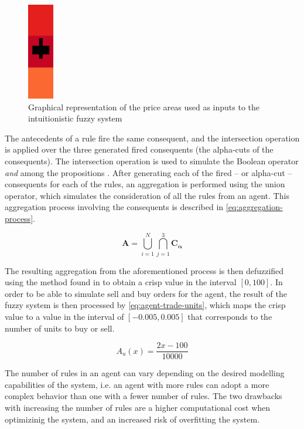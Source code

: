 \begin{figure}
\centering
\includegraphics[height=0.15\textwidth]{img/areas-for-ifis.png}
\caption{Graphical representation of the price areas used as inputs to the
  intuitionistic fuzzy system}
\label{figure:areas-for-ifis}
\end{figure}

The antecedents of a rule fire the same consequent, and the intersection
operation is applied over the three generated fired consequents (the alpha-cuts
of the consequents). The intersection operation is used to simulate the Boolean
operator \textit{and} among the propositions \cite{Atanassov1986}. After
generating each of the fired -- or alpha-cut -- consequents for each of the rules,
an aggregation is performed using the union operator, which simulates the
consideration of all the rules from an agent. This aggregation process involving
the consequents is described in \ref{eq:aggregation-process}.

\begin{equation}
  \label{eq:aggregation-process}
  \bm{A} = \bigcup\limits_{i=1}^{N} \bigcap\limits_{j=1}^{3} \bm{C_{\alpha}}
\end{equation}

The resulting aggregation from the aforementioned process is then
defuzzified using the method found in \cite{Hernandez-Aguila2017} to obtain a
crisp value in the interval $[0, 100]$. In order to be able to simulate sell and
buy orders for the agent, the result of the fuzzy system is then processed by
\ref{eq:agent-trade-units}, which maps the crisp value to a value in the
interval of $[-0.005, 0.005]$ that corresponds to the number of units to buy or
sell.

\begin{equation}
  \label{eq:agent-trade-units}
  A_u(x) = \frac{2x - 100}{10000}
\end{equation}

The number of rules in an agent can vary depending on the desired modelling
capabilities of the system, i.e. an agent with more rules can adopt a more
complex behavior than one with a fewer number of rules. The two drawbacks with
increasing the number of rules are a higher computational cost when optimizinig
the system, and an increased risk of overfitting the system. %

